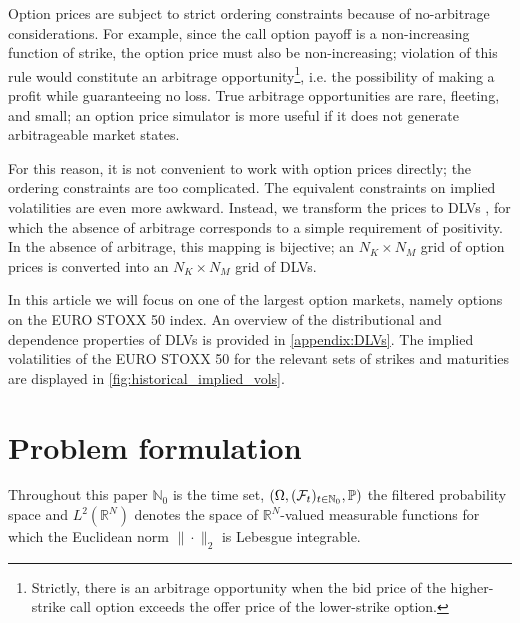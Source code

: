 \documentclass[]{article} %
\begin{document}
Option prices are subject to strict ordering constraints because of no-arbitrage considerations. For example, 
since the call option payoff is a non-increasing function of strike, the option price must also be non-increasing;
violation of this rule would constitute an arbitrage opportunity\footnote{Strictly, there is an arbitrage opportunity
when the bid price of the higher-strike call option exceeds the offer price of the lower-strike option.}, i.e.
the possibility of making a profit while guaranteeing no loss. True arbitrage opportunities are rare, 
fleeting, and small; an option price simulator is more useful if it does not generate arbitrageable market
states.

For this reason, it is not convenient to work with option prices directly; the ordering constraints are too 
complicated. The equivalent constraints on implied volatilities are even more awkward.
Instead, we transform the prices to DLVs 
\cite{Buehler2017, Wissel2007}, for which the absence of arbitrage corresponds to a simple requirement of 
positivity. In the absence of arbitrage, this mapping is bijective; an $N_K \times N_M$ grid of option prices is 
converted into an $N_K \times N_M$ grid of DLVs.

In this article we will focus on one of the largest option markets, namely options on the EURO STOXX 50 index. An overview of the distributional and dependence properties of DLVs is provided in \autoref{appendix:DLVs}. The implied volatilities of the EURO STOXX 50 for the relevant sets of strikes and maturities are displayed in \autoref{fig:historical_implied_vols}. 

\section{Problem formulation}
\label{sec:setup}
Throughout this paper $\mathbb{N}_0$ is the time set, $(\Omega, (\mathcal{F}_t)_{t\in \mathbb{N}_0}, \mathbb{P})$ the filtered probability space and $L^2(\mathbb{R}^N)$ denotes the space of $\mathbb{R}^N$-valued measurable functions for which the Euclidean norm $\|\cdot\|_2$ is Lebesgue integrable. 
\end{document}
